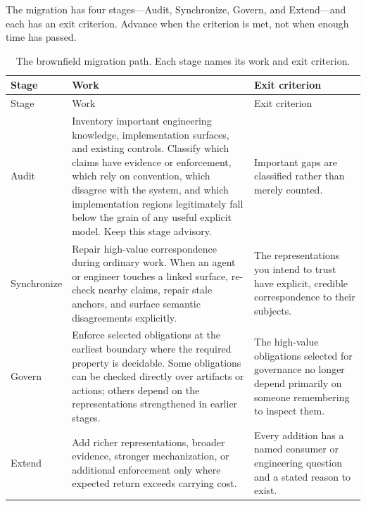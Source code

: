 The migration has four stages---Audit, Synchronize, Govern, and Extend---and each has an exit criterion. Advance when the criterion is met, not when enough time has passed.

{\footnotesize
\begin{longtable}[]{@{}
  >{\raggedright\arraybackslash}p{}
  >{\raggedright\arraybackslash}p{}
  >{\raggedright\arraybackslash}p{}@{}}
\caption[Audit, synchronize, govern, extend]{The brownfield migration path. Each stage names its work and exit criterion.}\tabularnewline
\toprule\noalign{}
\begin{minipage}[b]{\linewidth}\raggedright
Stage
\end{minipage} & \begin{minipage}[b]{\linewidth}\raggedright
Work
\end{minipage} & \begin{minipage}[b]{\linewidth}\raggedright
Exit criterion
\end{minipage} \\
\midrule\noalign{}
\endfirsthead
\toprule\noalign{}
\begin{minipage}[b]{\linewidth}\raggedright
Stage
\end{minipage} & \begin{minipage}[b]{\linewidth}\raggedright
Work
\end{minipage} & \begin{minipage}[b]{\linewidth}\raggedright
Exit criterion
\end{minipage} \\
\midrule\noalign{}
\endhead
\bottomrule\noalign{}
\endlastfoot
Audit & Inventory important engineering knowledge, implementation surfaces, and existing controls. Classify which claims have evidence or enforcement, which rely on convention, which disagree with the system, and which implementation regions legitimately fall below the grain of any useful explicit model. Keep this stage advisory. & Important gaps are classified rather than merely counted. \\
Synchronize & Repair high-value correspondence during ordinary work. When an agent or engineer touches a linked surface, re-check nearby claims, repair stale anchors, and surface semantic disagreements explicitly. & The representations you intend to trust have explicit, credible correspondence to their subjects. \\
Govern & Enforce selected obligations at the earliest boundary where the required property is decidable. Some obligations can be checked directly over artifacts or actions; others depend on the representations strengthened in earlier stages. & The high-value obligations selected for governance no longer depend primarily on someone remembering to inspect them. \\
Extend & Add richer representations, broader evidence, stronger mechanization, or additional enforcement only where expected return exceeds carrying cost. & Every addition has a named consumer or engineering question and a stated reason to exist. \\
\end{longtable}
}

